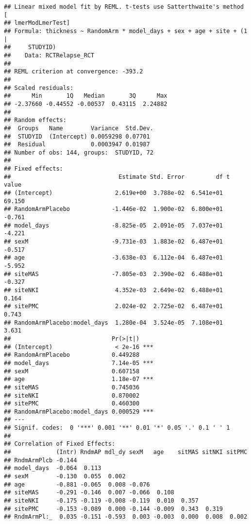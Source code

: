 \documentclass[]{article}
\theoremstyle{definition}
\theoremstyle{definition}
\theoremstyle{definition}
\theoremstyle{remark}
\begin{document}
\begin{verbatim}
## Linear mixed model fit by REML. t-tests use Satterthwaite's method [
## lmerModLmerTest]
## Formula: thickness ~ RandomArm * model_days + sex + age + site + (1 |  
##     STUDYID)
##    Data: RCTRelapse_RCT
## 
## REML criterion at convergence: -393.2
## 
## Scaled residuals: 
##      Min       1Q   Median       3Q      Max 
## -2.37660 -0.44552 -0.00537  0.43115  2.24882 
## 
## Random effects:
##  Groups   Name        Variance  Std.Dev.
##  STUDYID  (Intercept) 0.0059298 0.07701 
##  Residual             0.0003947 0.01987 
## Number of obs: 144, groups:  STUDYID, 72
## 
## Fixed effects:
##                               Estimate Std. Error         df t value
## (Intercept)                  2.619e+00  3.788e-02  6.541e+01  69.150
## RandomArmPlacebo            -1.446e-02  1.900e-02  6.800e+01  -0.761
## model_days                  -8.825e-05  2.091e-05  7.037e+01  -4.221
## sexM                        -9.731e-03  1.883e-02  6.487e+01  -0.517
## age                         -3.638e-03  6.112e-04  6.487e+01  -5.952
## siteMAS                     -7.805e-03  2.390e-02  6.488e+01  -0.327
## siteNKI                      4.352e-03  2.649e-02  6.488e+01   0.164
## sitePMC                      2.024e-02  2.725e-02  6.487e+01   0.743
## RandomArmPlacebo:model_days  1.280e-04  3.524e-05  7.108e+01   3.631
##                             Pr(>|t|)    
## (Intercept)                  < 2e-16 ***
## RandomArmPlacebo            0.449288    
## model_days                  7.14e-05 ***
## sexM                        0.607158    
## age                         1.18e-07 ***
## siteMAS                     0.745036    
## siteNKI                     0.870002    
## sitePMC                     0.460300    
## RandomArmPlacebo:model_days 0.000529 ***
## ---
## Signif. codes:  0 '***' 0.001 '**' 0.01 '*' 0.05 '.' 0.1 ' ' 1
## 
## Correlation of Fixed Effects:
##             (Intr) RndmAP mdl_dy sexM   age    sitMAS sitNKI sitPMC
## RndmArmPlcb -0.144                                                 
## model_days  -0.064  0.113                                          
## sexM        -0.130  0.055  0.002                                   
## age         -0.881 -0.065  0.008 -0.076                            
## siteMAS     -0.291 -0.146  0.007 -0.066  0.108                     
## siteNKI     -0.175 -0.119 -0.008 -0.119  0.010  0.357              
## sitePMC     -0.153 -0.089  0.000 -0.144 -0.009  0.343  0.319       
## RndmArmPl:_  0.035 -0.151 -0.593  0.003 -0.003  0.000  0.008  0.002
\end{verbatim}
\end{document}
